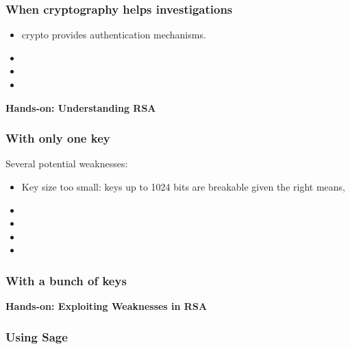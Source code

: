 \documentclass{beamer}
\begin{document}
\begin{frame}
        \frametitle{When cryptography helps investigations}
        \begin{itemize}
          \item crypto provides authentication mechanisms.
          \item
          \item
          \item
        \end{itemize}

\end{frame}

\begin{frame}
  \begin{center}
    {\bf Hands-on: Understanding RSA}
  \end{center}
\end{frame}

\begin{frame}
  \frametitle{With only one key}
  Several potential weaknesses:
  \begin{itemize}
    \item Key size too small: keys up to 1024 bits are breakable given the
      right means,
    \item  
    \item
    \item
    \item
  \end{itemize}

\end{frame}


\begin{frame}
  \frametitle{With a bunch of  keys}
\end{frame}



\begin{frame}
  \begin{center}
    {\bf Hands-on: Exploiting Weaknesses in RSA}
  \end{center}
\end{frame}

\begin{frame}
  \frametitle{Using Sage}
\end{frame}
\end{document}
